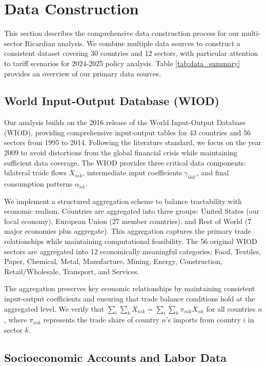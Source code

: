 \section{Data Construction}

This section describes the comprehensive data construction process for our multi-sector Ricardian analysis. We combine multiple data sources to construct a consistent dataset covering 30 countries and 12 sectors, with particular attention to tariff scenarios for 2024-2025 policy analysis. Table \ref{tab:data_summary} provides an overview of our primary data sources.

\subsection{World Input-Output Database (WIOD)}

Our analysis builds on the 2016 release of the World Input-Output Database (WIOD), providing comprehensive input-output tables for 43 countries and 56 sectors from 1995 to 2014. Following the literature standard, we focus on the year 2009 to avoid distortions from the global financial crisis while maintaining sufficient data coverage. The WIOD provides three critical data components: bilateral trade flows $X_{nik}$, intermediate input coefficients $\gamma_{ikk'}$, and final consumption patterns $\alpha_{nk}$.

We implement a structured aggregation scheme to balance tractability with economic realism. Countries are aggregated into three groups: United States (our focal economy), European Union (27 member countries), and Rest of World (7 major economies plus aggregate). This aggregation captures the primary trade relationships while maintaining computational feasibility. The 56 original WIOD sectors are aggregated into 12 economically meaningful categories: Food, Textiles, Paper, Chemical, Metal, Manufacture, Mining, Energy, Construction, Retail/Wholesale, Transport, and Services.

The aggregation preserves key economic relationships by maintaining consistent input-output coefficients and ensuring that trade balance conditions hold at the aggregated level. We verify that $\sum_{i} \sum_{k} X_{nik} = \sum_{i} \sum_{k} \pi_{nik} X_{nk}$ for all countries $n$, where $\pi_{nik}$ represents the trade share of country $n$'s imports from country $i$ in sector $k$.

\subsection{Socioeconomic Accounts and Labor Data}

